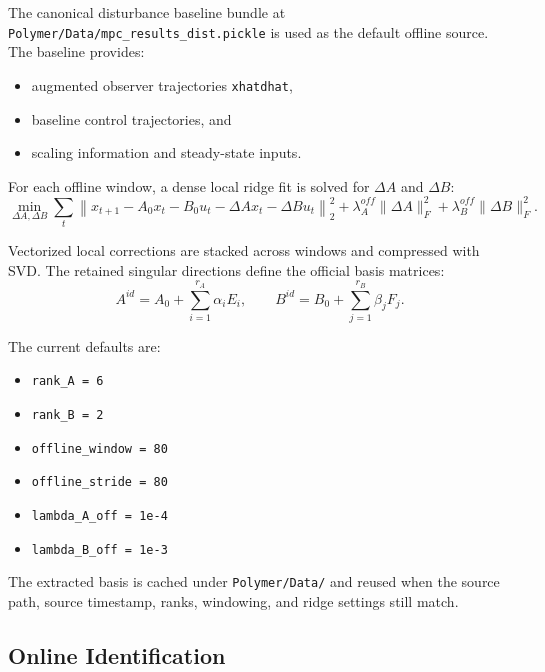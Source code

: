 The canonical disturbance baseline bundle at \texttt{Polymer/Data/mpc\_results\_dist.pickle} is used as the default offline source. The baseline provides:
\begin{itemize}
    \item augmented observer trajectories \texttt{xhatdhat},
    \item baseline control trajectories, and
    \item scaling information and steady-state inputs.
\end{itemize}

For each offline window, a dense local ridge fit is solved for $\Delta A$ and $\Delta B$:
\[
\min_{\Delta A,\Delta B}
\sum_t \left\|x_{t+1} - A_0 x_t - B_0 u_t - \Delta A x_t - \Delta B u_t\right\|_2^2
 + \lambda_A^{off}\|\Delta A\|_F^2 + \lambda_B^{off}\|\Delta B\|_F^2.
\]

Vectorized local corrections are stacked across windows and compressed with SVD. The retained singular directions define the official basis matrices:
\[
A^{id} = A_0 + \sum_{i=1}^{r_A}\alpha_i E_i,
\qquad
B^{id} = B_0 + \sum_{j=1}^{r_B}\beta_j F_j.
\]

The current defaults are:
\begin{itemize}
    \item \texttt{rank\_A = 6}
    \item \texttt{rank\_B = 2}
    \item \texttt{offline\_window = 80}
    \item \texttt{offline\_stride = 80}
    \item \texttt{lambda\_A\_off = 1e-4}
    \item \texttt{lambda\_B\_off = 1e-3}
\end{itemize}

The extracted basis is cached under \texttt{Polymer/Data/} and reused when the source path, source timestamp, ranks, windowing, and ridge settings still match.

\subsection{Online Identification}

